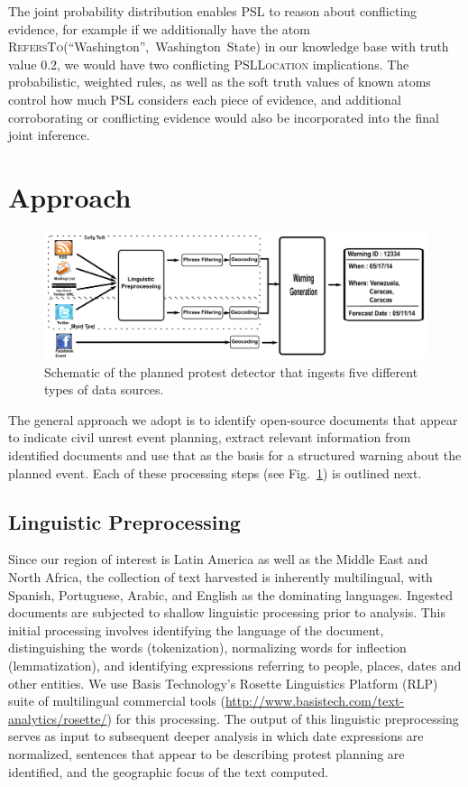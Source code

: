 \documentclass[letterpaper]{article}
\begin{document}
\begin{exmp}
The joint probability distribution enables PSL to reason about
conflicting evidence, for example if we additionally have the atom
\mbox{\textsc{RefersTo}(``Washington'', Washington State)} in our
knowledge base with truth value 0.2, we would have two conflicting
\textsc{PSLLocation} implications.  The probabilistic, weighted rules,
as well as the soft truth values of known atoms control how much PSL
considers each piece of evidence, and additional corroborating or
conflicting evidence would also be incorporated into the final joint
inference.
\end{exmp}

\section{Approach}
\begin{figure}
\includegraphics[width=\textwidth]{pipeline}
\caption{Schematic of the planned protest detector that ingests five
different types of data sources.}
\label{flowchart}
\end{figure}
The general approach we adopt is to identify open-source documents that
appear to indicate civil unrest event planning, extract relevant
information from identified documents and use that as the basis for a
structured warning about the planned event. 
Each of these processing steps (see Fig.~\ref{flowchart}) is outlined
next.

\subsection{Linguistic Preprocessing}
Since our region of interest is Latin America as well as the Middle East
and North Africa, the collection of text harvested is inherently
multilingual, with Spanish, Portuguese, Arabic, and English as the
dominating languages. Ingested documents are subjected to shallow
linguistic processing prior to analysis.  This initial processing
involves identifying the language of the document, distinguishing the
words (tokenization), normalizing words for inflection (lemmatization),
and identifying expressions referring to people, places, dates and other
entities.  We use Basis Technology's Rosette Linguistics Platform (RLP)
suite of multilingual commercial tools
(\url{http://www.basistech.com/text-analytics/rosette/}) for this
processing.  The output of this linguistic preprocessing serves as input
to subsequent deeper analysis in which date expressions are normalized,
sentences that appear to be describing protest planning are identified,
and the geographic focus of the text computed.
\end{document}

